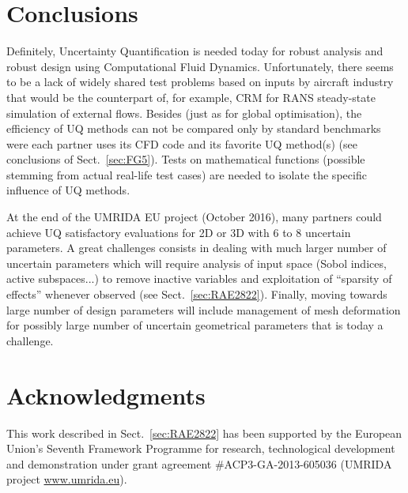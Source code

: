 \documentclass{eurosae}
\newcommand{\sref}[1]{Sect.~\ref{#1}}
\begin{document}
%
%
\section{Conclusions}\label{sec:CL}
%
Definitely, Uncertainty Quantification is needed today for robust analysis and robust design using Computational Fluid Dynamics. Unfortunately, there seems to be a lack of widely shared test problems based on inputs by aircraft industry that would be the counterpart of, for example, CRM for RANS steady-state simulation of external flows. 
Besides (just as for global optimisation), the efficiency of UQ methods can not be compared only by standard benchmarks were each partner uses its CFD code and its favorite UQ method(s) (see conclusions of \sref{sec:FG5}). Tests on mathematical functions (possible stemming from actual real-life test cases) are needed to isolate the specific influence of UQ methods.
   
 At the end of the UMRIDA EU project (October 2016), many partners could achieve UQ satisfactory evaluations for 2D or 3D with 6 to 8 uncertain parameters. A great challenges consists in dealing with much larger number of uncertain parameters which will require analysis of input space (Sobol indices, active subspaces...) to remove inactive variables and exploitation of
 ``sparsity of effects'' whenever observed (see \sref{sec:RAE2822}). Finally, moving towards large number of design parameters will include management of mesh deformation for possibly large number of uncertain geometrical parameters that is today a challenge. 
%
%

\section*{Acknowledgments}

This work described in \sref{sec:RAE2822} has been supported by the European Union's Seventh Framework Programme for research, technological development and demonstration under grant agreement {\#}ACP3-GA-2013-605036 (UMRIDA project \href{http://www.umrida.eu}{www.umrida.eu}).



\end{document}
